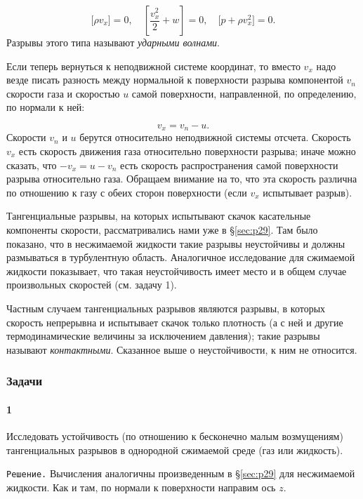 \begin{equation}
    \label{eq:84.7}
    \lbrack \rho v_x \rbrack = 0, \quad \left\lbrack \frac{v^2_x}{2} + w \right\rbrack = 0, \quad
    \lbrack p + \rho v^2_x \rbrack = 0.
\end{equation}
Разрывы этого типа называют \emph{ударными волнами}.

Если теперь вернуться к неподвижной системе координат, то вместо $v_x$ надо везде писать разность между нормальной к поверхности разрыва компонентой $v_n$ скорости газа и скоростью $u$ самой поверхности, направленной, по определению, по нормали к ней:

\begin{equation}
    \label{eq:84.8}
    v_x = v_n - u.
\end{equation}
Скорости $v_n$ и $u$ берутся относительно неподвижной системы отсчета.
Скорость $v_x$ есть скорость движения газа относительно поверхности разрыва; иначе можно сказать, что $-v_x = u - v_n$ есть скорость распространения самой поверхности разрыва относительно газа.
Обращаем внимание на то, что эта скорость различна по отношению к газу с обеих сторон поверхности (если $v_x$ испытывает разрыв).

Тангенциальные разрывы, на которых испытывают скачок касательные компоненты скорости, рассматривались нами уже в \S \ref{sec:p29}.
Там было показано, что в несжимаемой жидкости такие разрывы неустойчивы и должны размываться в турбулентную область.
Аналогичное исследование для сжимаемой жидкости показывает, что такая неустойчивость имеет место и в общем случае произвольных скоростей (см. задачу 1).

Частным случаем тангенциальных разрывов являются разрывы, в которых скорость непрерывна и испытывает скачок только плотность (а с ней и другие термодинамические величины за исключением давления); такие разрывы называют \emph{контактными}.
Сказанное выше о неустойчивости, к ним не относится.


\subsubsection*{Задачи}
\paragraph*{1}
Исследовать устойчивость (по отношению к бесконечно малым возмущениям) тангенциальных разрывов в однородной сжимаемой среде (газ или жидкость).

\texttt{Решение.} Вычисления аналогичны произведенным в \S \ref{sec:p29} для несжимаемой жидкости.
Как и там, по нормали к поверхности направим ось $z$.

